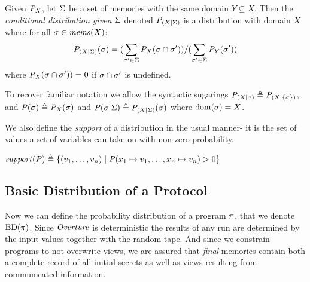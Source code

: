 \begin{definition}
  Given ${\mathit{P}}_{X}$, let $\Sigma$ be a set of memories with the
  same domain $Y \subseteq X$. Then the \emph{conditional distribution given
  $\Sigma$}  denoted
  $\mathit{P}_{({X}|{\Sigma})}$ is a distribution with domain $X$ where for all
  $\sigma \in \mathit{mems}(X)$:
  $$
  \mathit{P}_{({X}|{\Sigma})}(\sigma) =
  (\sum_{\sigma' \in \Sigma} {\mathit{P}}_{X}(\sigma \cap \sigma')) /
  (\sum_{\sigma' \in \Sigma} {\mathit{P}}_{Y}(\sigma'))
  $$
  where ${\mathit{P}}_{X}(\sigma \cap \sigma')) = 0$ if $\sigma \cap \sigma'$ is undefined.
\end{definition}
To recover familiar notation we allow the syntactic
sugarings $\mathit{P}_{({X}|{\sigma})}  \triangleq \mathit{P}_{({X}|{\{ \sigma\}})}$, and
$\mathit{P}(\sigma)  \triangleq {\mathit{P}}_{X}(\sigma)$ and $\mathit{P}(\sigma|\Sigma) \triangleq
\mathit{P}_{({X}|{\Sigma})}(\sigma)$ where $\mathrm{dom}(\sigma) = X$.

We also define the \emph{support} of a distribution in the usual manner-
it is the set of values a set of variables can take on with non-zero
probability.
\begin{definition}[Support]
  $\mathit{support}(\mathit{P}) \triangleq \{ (v_1,\ldots,v_n) \mid
  \mathit{P}(x_1 \mapsto v_1, \ldots, x_n \mapsto v_n) > 0 \} $
\end{definition}

\subsection{Basic Distribution of a Protocol}
Now we can define the probability distribution of a program $\pi$,
that we denote $\mathrm{BD}(\pi)$. Since $\mathit{Overture}$ is deterministic the
results of any run are determined by the input values together with
the random tape. And since we constrain programs to not overwrite
views, we are assured that \emph{final} memories contain both a
complete record of all initial secrets as well as views resulting from
communicated information. 


